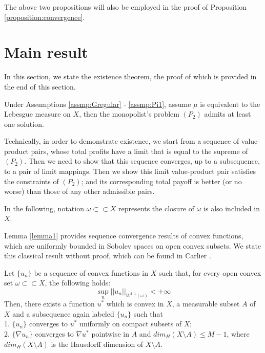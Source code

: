 


The above two propositions will also be employed in the proof of Proposition \ref{proposition:convergence}. 

\bigskip







\section{Main result}\label{section:mainresult}
In this section, we state the existence theorem, the proof of which is provided in the end of this section.


\begin{theorem}[Existence]
	Under Assumptions \ref{assmp:Gregular} - \ref{assmp:Pi1}, assume $\mu$ is equivalent to the Lebesgue measure on $X$, then the monopolist's problem $(P_2)$ admits at least one solution.
\end{theorem}

Technically, in order to demonstrate existence, we start from a sequence of value-product pairs, whose total profits have a limit that is equal to the supreme of $(P_2)$.
Then we need to show that this sequence converges, up to a subsequence, to a pair of limit mappings. Then we show this limit value-product pair satisfies the constraints of $(P_2)$; and its corresponding total payoff is better (or no worse) than those of any other admissible pairs. \medskip


In the following, notation $\omega \subset \subset X$ represents the closure of $\omega$ is also included in $X$.\medskip

Lemma \ref{lemma1} provides sequence convergence results of convex functions, which are uniformly bounded in Sobolev spaces on open convex subsets. We state this classical result without proof, which can be found in Carlier \cite{Carlier01}.\medskip


\begin{lemma}\label{lemma1}
	Let $\{u_n\}$ be a sequence of convex functions in $X$ such that, for every open convex set $\omega \subset \subset X$, the following holds:
	\begin{equation*}
	\sup\limits_{n} ||u_n||_{W^{1,1}(\omega)} < +\infty
	\end{equation*}
	Then, there exists a function $u^*$ %
	which is convex in $X$, a measurable subset $A$ of $X$ and a subsequence again labeled $\{u_n\}$ such that\\
	1. $\{u_n\}$ converges to $u^*$ uniformly on compact subsets of $X$;\\
	2. $\{\nabla u_n\}$ converges to $\nabla u^*$ pointwise in $A$ and $dim_{H}(X\setminus A)\le M-1$, where $dim_{H}(X\setminus A)$ is the Hausdorff dimension of $X\setminus A$.
\end{lemma}


